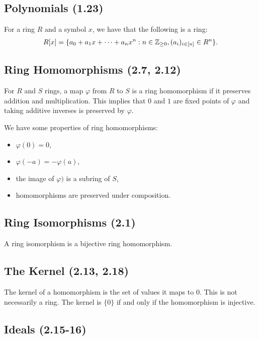 \subsection{Polynomials (1.23)} \label{1.23}

For a ring $R$ and a symbol $x$, we have that the following is a ring: \begin{align*}
    R[x] = \{a_0 + a_1x + \cdots + a_nx^n : n \in \mathbb{Z}_{\geq 0}, (a_i)_{i \in [n]} \in R^n\}.
\end{align*} 

\subsection{Ring Homomorphisms (2.7, 2.12)} \label{2.7} \label{2.12}

For $R$ and $S$ rings, a map $\varphi$ from $R$ to $S$ is a ring
homomorphism if it preserves addition and multiplication.
This implies that $0$ and $1$ are fixed points of $\varphi$
and taking additive inverses is preserved by $\varphi$.

\newpage
\noindent
We have some properties of ring homomorphisms: \begin{itemize}
    \item $\varphi(0) = 0$,
    \item $\varphi(-a) = -\varphi(a)$,
    \item the image of $\varphi)$ is a subring of $S$,
    \item homomorphisms are preserved under composition.
\end{itemize}

\subsection{Ring Isomorphisms (2.1)} \label{2.1}

A ring isomorphism is a bijective ring homomorphism.

\subsection{The Kernel (2.13, 2.18)} \label{2.13} \label{2.18}

The kernel of a homomorphism is the set of values it maps to $0$.
This is not necessarily a ring. The kernel is $\{0\}$ if and only
if the homomorphism is injective.

\subsection{Ideals (2.15-16)} \label{2.15} \label{2.16}

